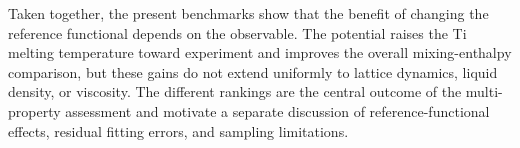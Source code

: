 
Taken together, the present benchmarks show that the benefit of changing the reference functional depends on the observable.
The \rscan{} potential raises the Ti melting temperature toward experiment and improves the overall mixing-enthalpy comparison, but these gains do not extend uniformly to lattice dynamics, liquid density, or viscosity.
The different rankings are the central outcome of the multi-property assessment and motivate a separate discussion of reference-functional effects, residual fitting errors, and sampling limitations.
